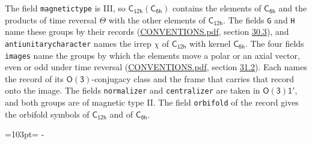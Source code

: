 \documentclass[10pt,a4paper]{article}
\newcommand{\needspace}[1]{\par\penalty-100\begingroup\dimen0=#1\relax\dimen2=\pagegoal
  \advance\dimen2-\pagetotal\ifdim\dimen0>\dimen2\relax\ifdim\dimen2>0pt\vfil\break\fi\fi
  \endgroup}
\numberwithin{equation}{section}
\newcommand{\grp}[1]{\mathsf{#1}}
\begin{document}
The field \texttt{magnetictype} is III, so $\grp{C_{12h}}(\grp{C_{6h}})$ contains the elements of $\grp{C_{6h}}$ and the products of time reversal $\varTheta$ with the other elements of $\grp{C_{12h}}$. The fields \texttt{G} and \texttt{H} name these groups by their records (\href{../../CONVENTIONS.pdf}{CONVENTIONS.pdf}, section \href{../../CONVENTIONS.pdf\#conv.30.3}{30.3}), and \texttt{antiunitarycharacter} names the irrep $\chi$ of $\grp{C_{12h}}$ with kernel $\grp{C_{6h}}$. The four fields \texttt{images} name the groups by which the elements move a polar or an axial vector, even or odd under time reversal (\href{../../CONVENTIONS.pdf}{CONVENTIONS.pdf}, section \href{../../CONVENTIONS.pdf\#conv.31.2}{31.2}). Each names the record of its $\grp{O(3)}$-conjugacy class and the frame that carries that record onto the image. The fields \texttt{normalizer} and \texttt{centralizer} are taken in $\grp{O(3)1'}$, and both groups are of magnetic type II. The field \texttt{orbifold} of the record gives the orbifold symbols of $\grp{C_{12h}}$ and of $\grp{C_{6h}}$.
\needspace{103pt}
\end{document}
